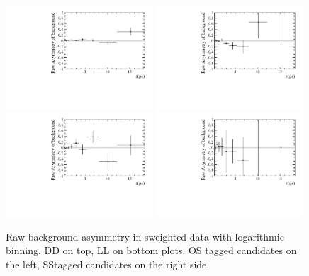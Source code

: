 \begin{figure}[!htb]
\centering
\includegraphics[width=0.49\textwidth]{06-Bd2JpsiKS/figs/BackgroundAsymmetryByHand_DD_OS_data.pdf}
\includegraphics[width=0.49\textwidth]{06-Bd2JpsiKS/figs/BackgroundAsymmetryByHand_DD_SSPion_data.pdf}\\
\includegraphics[width=0.49\textwidth]{06-Bd2JpsiKS/figs/BackgroundAsymmetryByHand_LL_OS_data.pdf}
\includegraphics[width=0.49\textwidth]{06-Bd2JpsiKS/figs/BackgroundAsymmetryByHand_LL_SSPion_data.pdf}
\caption{Raw background asymmetry in sweighted data with logarithmic binning.
DD on top, LL on bottom plots. OS tagged candidates on the left, SS\pion tagged
candidates on the right side.}
\label{fig:background_asymmetry_sweighted}
\end{figure}
